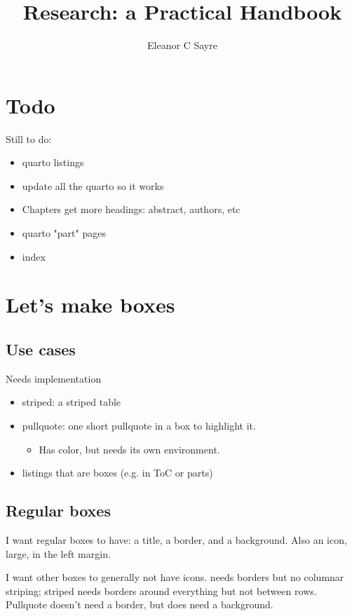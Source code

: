 \documentclass[
  letterpaper, 12pt
]{report}
\title{Research: a Practical Handbook}
\author{Eleanor C Sayre}
\date{}
\begin{document}
\maketitle


\chapter{Todo}

Still to do:
\begin{itemize}
\item quarto listings
\item update all the quarto so it works
\item Chapters get more headings: abstract, authors, etc
\item quarto "part" pages
\item index
\end{itemize}

\chapter{Let's make boxes}

\section{Use cases}

Needs implementation
\begin{itemize}
\item striped: a striped table
\item pullquote: one short pullquote in a box to highlight it. 
\begin{itemize}
\item Has color, but needs its own environment.  
\end{itemize}
\item listings that are boxes (e.g. in ToC or parts)
\end{itemize}

\section{Regular boxes}

I want regular boxes to have: a title, a border, and a background.  Also an icon, large, in the left margin. 

I want other boxes to generally not have icons.   needs borders but no columnar striping; striped needs borders around everything but not between rows.  Pullquote doesn't need a border, but does need a background. 
\end{document}
